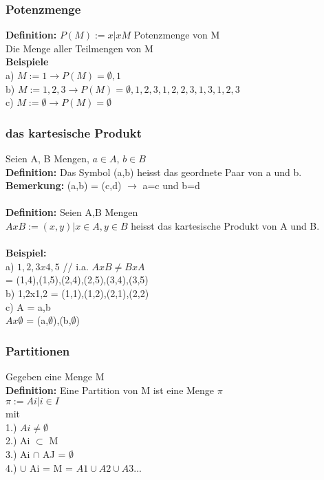 \documentclass[11pt,a4paper]{article}
\begin{document}
\subsubsection{Potenzmenge}
\textbf{Definition:} $ P(M) := { x | x M } $ Potenzmenge von M\\
Die Menge aller Teilmengen von M\\
\textbf{Beispiele}\\
a) $ M:={1} \rightarrow P(M) = {\emptyset,{1}}$\\
b) $ M:= {1,2,3} \rightarrow P(M) = {\emptyset, {1},{2},{3},{1,2},{2,3},{1,3},{1,2,3}}$\\
c) $ M:= \emptyset \rightarrow P(M) = {\emptyset}$

\subsubsection{das kartesische Produkt}
Seien A, B Mengen, $a \in A$, $b \in B$\\
\textbf{Definition:} Das Symbol (a,b) heisst das geordnete Paar von a und b.\\
\textbf{Bemerkung:} (a,b) = (c,d) $\rightarrow$ a=c und b=d\\\\

\textbf{Definition:} Seien A,B Mengen\\
$AxB := { (x,y) | x \in A, y \in B }$ heisst das kartesische Produkt von A und B.\\\\

\textbf{Beispiel:} \\
a) ${1,2,3} x {4,5}$ // i.a. $AxB \neq BxA$\\
= { (1,4),(1,5),(2,4),(2,5),(3,4),(3,5) } \\
b) {1,2}x{1,2} = {(1,1),(1,2),(2,1),(2,2)}\\
c) A = {a,b}\\
$Ax\emptyset$ = {(a,$\emptyset$),(b,$\emptyset$)}\\

\subsubsection{Partitionen}
Gegeben eine Menge M\\
\textbf{Definition:} Eine Partition von M ist eine Menge $\pi$\\
$\pi := {Ai | i \in I } $\\
mit \\
1.) $Ai \neq \emptyset$\\
2.) Ai $\subset$ M \\
3.) Ai $\cap$ AJ = $\emptyset$\\
4.) $\cup$ Ai = M = $ A1 \cup A2 \cup A3 ... $
\end{document}
